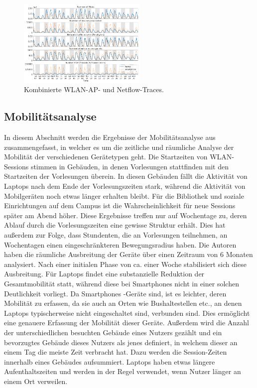 \documentclass[12pt, a4paper]{article}
\begin{document}
\begin{figure}[H]
    \centering
    \includegraphics[width=0.55\textwidth]{img/traces.png}
    \caption{Kombinierte WLAN-AP- und Netflow-Traces. \cite{Alipour2018}}
    \label{fig:traces}
\end{figure}

\subsection{Mobilitätsanalyse}
\label{sec:phase2_a}

In diesem Abschnitt werden die Ergebnisse der Mobilitätsanalyse aus \cite{Alipour2018} zusammengefasst, in welcher es
um die zeitliche und räumliche Analyse der Mobilität der verschiedenen Gerätetypen geht.
Die Startzeiten von WLAN-Sessions stimmen in Gebäuden, in denen Vorlesungen stattfinden mit den Startzeiten der Vorlesungen überein.
In diesen Gebäuden fällt die Aktivität von Laptops nach dem Ende der Vorlesungszeiten stark, während die Aktivität von Mobilgeräten
noch etwas länger erhalten bleibt. Für die Bibliothek und soziale Einrichtungen auf dem Campus ist die Wahrscheinlichkeit
für neue Sessions später am Abend höher. Diese Ergebnisse treffen nur auf Wochentage zu, deren Ablauf durch
die Vorlesungszeiten eine gewisse Struktur erhält.
Dies hat außerdem zur Folge, dass Stundenten, die an Vorlesungen teilnehmen, an Wochentagen einen eingeschränkteren Bewegungsradius haben.
Die Autoren haben die räumliche Ausbreitung der Geräte über einen Zeitraum von $6$ Monaten analysiert.
Nach einer initialen Phase von ca. einer Woche stabilisiert sich diese Ausbreitung. Für Laptops findet eine 
substanzielle Reduktion der Gesamtmobilität statt, während diese bei Smartphones nicht in einer solchen Deutlichkeit vorliegt.
Da Smartphones -Geräte sind, ist es leichter, deren Mobilität zu erfassen, da sie auch an Orten
wie Bushaltestellen etc., an denen Laptops typischerweise nicht eingeschaltet sind, verbunden sind.
Dies ermöglicht eine genauere Erfassung der Mobilität dieser Geräte.
Außerdem wird die Anzahl der unterschiedlichen besuchten Gebäude eines Nutzers gezählt und ein bevorzugtes
Gebäude dieses Nutzers als jenes definiert, in welchem dieser an einem Tag die meiste Zeit verbracht hat.
Dazu werden die Session-Zeiten innerhalb eines Gebäudes aufsummiert.
Laptops haben etwas längere Aufenthaltszeiten und werden in der Regel verwendet, wenn Nutzer länger an einem Ort verweilen.
\end{document}
